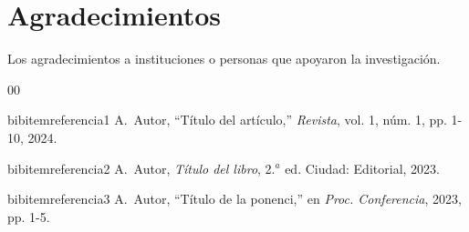 \documentclass[conference, a4paper]{IEEEtran}
\begin{document}
\section*{Agradecimientos}
Los agradecimientos a instituciones o personas que apoyaron la investigación.

\begin{thebibliography}{00}

bibitem{referencia1}
A.~Autor, ``Título del artículo,'' \emph{Revista}, vol. 1, núm. 1, pp. 1-10, 2024.

bibitem{referencia2}
A.~Autor, \emph{Título del libro}, 2.$^a$ ed. Ciudad: Editorial, 2023.

bibitem{referencia3}
A.~Autor, ``Título de la ponenci,'' en \emph{Proc. Conferencia}, 2023, pp. 1-5.

\end{thebibliography}
\end{document}
